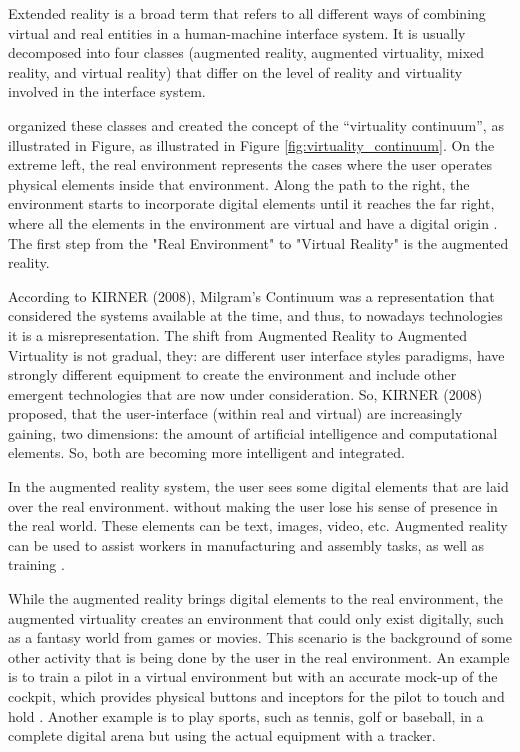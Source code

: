Extended reality is a broad term that refers to all different ways of combining virtual and real entities in a human-machine interface system. It is usually decomposed into four classes (augmented reality, augmented virtuality, mixed reality, and virtual reality) that differ on the level of reality and virtuality involved in the interface system. 

 organized these classes and created the concept of the “virtuality continuum”, as illustrated in Figure, as illustrated in Figure \ref{fig:virtuality_continuum}. On the extreme left, the real environment represents the cases where the user operates physical elements inside that environment. Along the path to the right, the environment starts to incorporate digital elements until it reaches the far right, where all the elements in the environment are virtual and have a digital origin \cite{nijholt2005virtuality, doolani2020review}. The first step from the "Real Environment" to "Virtual Reality" is the augmented reality.

According to KIRNER (2008), Milgram’s Continuum was a representation that considered the systems available at the time, and thus, to nowadays technologies it is a misrepresentation. The shift from Augmented Reality to Augmented Virtuality is not gradual, they: are different user interface styles paradigms, have strongly different equipment to create the environment and include other emergent technologies that are now under consideration. So, KIRNER (2008) proposed, that the user-interface (within real and virtual) are increasingly gaining, two dimensions: the amount of artificial intelligence and computational elements. So, both are becoming more intelligent and integrated.



In the augmented reality system, the user sees some digital elements that are laid over the real environment. without making the user lose his sense of presence in the real world. These elements can be text, images, video, etc. Augmented reality can be used to assist workers in manufacturing and assembly tasks, as well as training \cite{doolani2020review, farrell2018learning, ma2007virtuality}.
    
While the augmented reality brings digital elements to the real environment, the augmented virtuality creates an environment that could only exist digitally, such as a fantasy world from games or movies. This scenario is the background of some other activity that is being done by the user in the real environment. An example is to train a pilot in a virtual environment but with an accurate mock-up of the cockpit, which provides physical buttons and inceptors for the pilot to touch and hold \cite{farshid2018go}. Another example is to play sports, such as tennis, golf or baseball, in a complete digital arena but using the actual equipment with a tracker.

